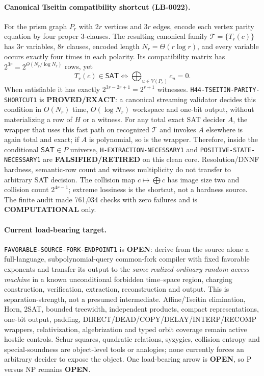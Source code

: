 \documentclass[11pt]{article}
\newcommand{\SAT}{\mathsf{SAT}}
\begin{document}
\paragraph{Canonical Tseitin compatibility shortcut (LB-0022).}
For the prism graph \(P_r\) with \(2r\) vertices and \(3r\) edges, encode
each vertex parity equation by four proper 3-clauses.  The resulting
canonical family \(\mathcal T=\{T_r(c)\}\) has \(3r\) variables, \(8r\)
clauses, encoded length \(N_r=\Theta(r\log r)\), and every variable occurs
exactly four times in each polarity.  Its compatibility matrix has
\(2^{3r}=2^{\Theta(N_r/\log N_r)}\) rows, yet
\[
 T_r(c)\in\SAT\iff\bigoplus_{u\in V(P_r)}c_u=0.
\]
When satisfiable it has exactly \(2^{3r-2r+1}=2^{r+1}\) witnesses.
\texttt{H44-TSEITIN-PARITY-SHORTCUT1} is \textbf{PROVED/EXACT}: a
canonical streaming validator decides this condition in \(O(N_r)\) time,
\(O(\log N_r)\) workspace and one-bit output, without materializing a row
of \(H\) or a witness.  For any total exact SAT decider \(A\), the wrapper
that uses this fast path on recognized \(\mathcal T\) and invokes \(A\)
elsewhere is again total and exact; if \(A\) is polynomial, so is the
wrapper.  Therefore, inside the conditional \(\SAT\in P\) universe,
\texttt{H-EXTRACTION-NECESSARY1} and
\texttt{POSITIVE-STATE-NECESSARY1} are
\textbf{FALSIFIED/RETIRED} on this clean core.  Resolution/DNNF hardness,
semantic-row count and witness multiplicity do not transfer to arbitrary
SAT decision.  The collision map \(c\mapsto\bigoplus c\) has image size
two and collision count \(2^{4r-1}\); extreme lossiness is the shortcut,
not a hardness source.  The finite audit made 761,034 checks with zero
failures and is \textbf{COMPUTATIONAL} only.

\paragraph{Current load-bearing target.}
\texttt{FAVORABLE-SOURCE-FORK-ENDPOINT1} is \textbf{OPEN}: derive from the
source alone a full-language, subpolynomial-query common-fork compiler with
fixed favorable exponents and transfer its output to the \emph{same realized
ordinary random-access machine} in a known unconditional forbidden
time--space region, charging construction, verification, extraction,
reconstruction and output.  This is separation-strength, not a presumed
intermediate.  Affine/Tseitin elimination, Horn, 2SAT, bounded treewidth,
independent products, compact representations, one-bit output, padding,
DIRECT/DEAD/COPY/DELAY/INTERP/RECOMP wrappers, relativization,
algebrization and typed orbit coverage remain active hostile controls.
Schur squares, quadratic relations, syzygies, collision entropy and
special-soundness are object-level tools or analogies; none currently forces
an arbitrary decider to expose the object.  One load-bearing arrow is
\textbf{OPEN}, so P versus NP remains \textbf{OPEN}.
\end{document}
